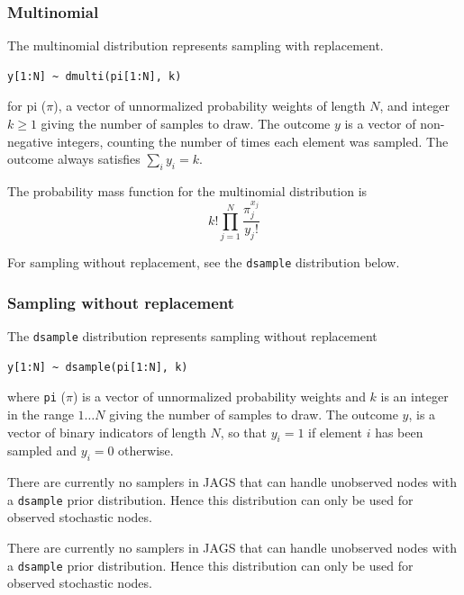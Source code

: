 \documentclass[11pt, a4paper, titlepage]{report}
\begin{document}
\subsubsection{Multinomial}
\label{bugs:dmulti}

The multinomial distribution represents sampling with replacement. 
\begin{verbatim}
y[1:N] ~ dmulti(pi[1:N], k)
\end{verbatim}
for pi ($\pi$), a vector of unnormalized probability weights of length $N$,
and integer $k \geq 1$ giving the number of samples to draw. The outcome
$y$ is a vector of non-negative integers, counting the number of times
each element was sampled. The outcome always satisfies $\sum_i y_i = k$.

The probability mass function for the multinomial distribution is
\[
k! \prod_{j=1}^N
\frac{\textstyle \pi_j^{x_j}}{\textstyle y_j!}
\]

For sampling without replacement, see the \texttt{dsample}
distribution below.
      

\subsubsection{Sampling without replacement}
\label{bugs:dsample}

The \texttt{dsample} distribution represents sampling without replacement
\begin{verbatim}
y[1:N] ~ dsample(pi[1:N], k)
\end{verbatim}
where \texttt{pi} ($\pi$) is a vector of unnormalized probability
weights and $k$ is an integer in the range $1 \ldots N$ giving the
number of samples to draw. The outcome $y$, is a vector of binary
indicators of length $N$, so that $y_i = 1$ if element $i$ has been
sampled and $y_i = 0$ otherwise.

There are currently no samplers in JAGS that can handle unobserved
nodes with a \texttt{dsample} prior distribution. Hence this
distribution can only be used for observed stochastic nodes.

There are currently no samplers in JAGS that can handle unobserved
nodes with a \texttt{dsample} prior distribution. Hence this
distribution can only be used for observed stochastic nodes.
\end{document}
